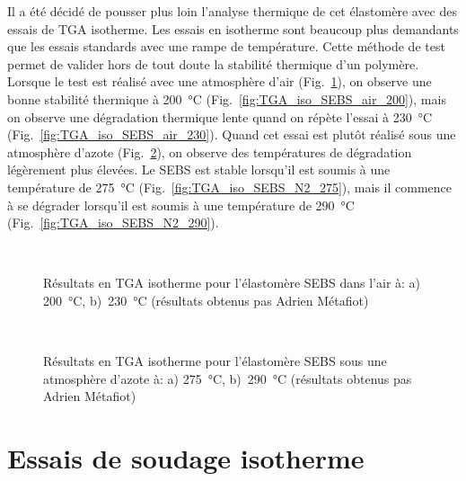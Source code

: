 Il a été décidé de pousser plus loin l'analyse thermique de cet élastomère avec des essais de TGA isotherme. 
Les essais en isotherme sont beaucoup plus demandants que les essais standards avec une rampe de température. 
Cette méthode de test permet de valider hors de tout doute la stabilité thermique d'un polymère. 
Lorsque le test est réalisé avec une atmosphère d'air (Fig.~\ref{fig:TGA_iso_SEBS_air}), on observe une bonne stabilité thermique à \SI[locale=FR]{200}{\celsius} (Fig.~\ref{fig:TGA_iso_SEBS_air_200}), mais on observe une dégradation thermique lente quand on répète l'essai à \SI[locale=FR]{230}{\celsius} (Fig.~\ref{fig:TGA_iso_SEBS_air_230}). 
Quand cet essai est plutôt réalisé sous une atmosphère d'azote (Fig.~\ref{fig:TGA_iso_SEBS_N2}), on observe des températures de dégradation légèrement plus élevées. 
Le SEBS est stable lorsqu'il est soumis à une température de \SI[locale=FR]{275}{\celsius} (Fig.~\ref{fig:TGA_iso_SEBS_N2_275}), mais il commence à se dégrader lorsqu'il est soumis à une température de \SI[locale=FR]{290}{\celsius} (Fig.~\ref{fig:TGA_iso_SEBS_N2_290}). 

\begin{figure}[h]
	\centering
	\\
	\caption{Résultats en TGA isotherme pour l'élastomère SEBS dans l'air à: a) \SI{200}{\celsius}, b)~\SI{230}{\celsius} (résultats obtenus pas Adrien Métafiot)}
	\label{fig:TGA_iso_SEBS_air}
\end{figure}

\begin{figure}[h]
	\centering
	\\
	\caption{Résultats en TGA isotherme pour l'élastomère SEBS sous une atmosphère d'azote à: a) \SI{275}{\celsius}, b)~\SI{290}{\celsius} (résultats obtenus pas Adrien Métafiot)}
	\label{fig:TGA_iso_SEBS_N2}
\end{figure}

\section*{Essais de soudage isotherme}

